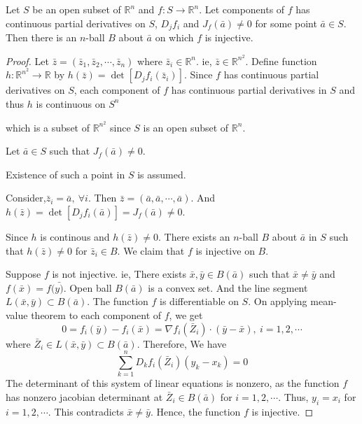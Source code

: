 \begin{theorem}
Let $S$ be an open subset of $\mathbb{R}^n$ and $f : S \to \mathbb{R}^n$.
Let components of $f$ has continuous partial derivatives on $S$, $D_jf_i$ and $J_f(\bar{a}) \ne 0$ for some point $\bar{a} \in S$.
Then there is an $n$-ball $B$ about $\bar{a}$ on which $f$ is injective.
\end{theorem}
\begin{proof}
Let $\bar{z} = (\bar{z}_1,\bar{z}_2,\cdots,\bar{z}_n)$ where $\bar{z}_i \in \mathbb{R}^n$.
ie, $\bar{z} \in \mathbb{R}^{n^2}$.
Define function $h : \mathbb{R}^{n^2} \to \mathbb{R}$ by $h(\bar{z}) = \det{[D_jf_i(\bar{z}_i)]}$.
Since $f$ has continuous partial derivatives on $S$, each component of $f$ has continuous partial derivatives in $S$ and thus $h$ is continuous on $S^n$ \begin{commentary} which is a subset of $\mathbb{R}^{n^2}$ since $S$ is an open subset of $\mathbb{R}^n$.
\end{commentary}

Let $\bar{a} \in S$ such that $J_f(\bar{a}) \ne 0$.
\begin{commentary}
Existence of such a point in $S$ is assumed.
\end{commentary}
Consider,$\bar{z}_i = \bar{a},\ \forall i$.
Then $\bar{z} = (\bar{a},\bar{a},\cdots,\bar{a})$.
And $h(\bar{z}) = \det{[D_jf_i(\bar{a})]} = J_f(\bar{a}) \ne 0$.

Since $h$ is continous and $h(\bar{z}) \ne 0$.
There exists an $n$-ball $B$ about $\bar{a}$ in $S$ such that $h(\bar{z}) \ne 0$ for $\bar{z}_i \in B$.
We claim that $f$ is injective on $B$.

Suppose $f$ is not injective.
ie, There exists $\bar{x},\bar{y} \in B(\bar{a})$ such that $\bar{x} \ne \bar{y}$ and $f(\bar{x}) = f(\bar{y)}$.
Open ball $B(\bar{a})$ is a convex set.
And the line segment $L(\bar{x},\bar{y}) \subset B(\bar{a})$.
The function $f$ is differentiable on $S$.
On applying mean-value theorem to each component of $f$, we get
$$0 = f_i(\bar{y})-f_i(\bar{x}) = \nabla f_i(\bar{Z}_i)\cdot(\bar{y}-\bar{x}),\ i=1,2,\cdots$$
where $\bar{Z}_i \in L(\bar{x},\bar{y}) \subset B(\bar{a})$.
Therefore, We have
$$ \sum_{k=1}^n D_kf_i(\bar{Z}_i)(y_k-x_k) = 0$$
The determinant of this system of linear equations is nonzero, as the function $f$ has nonzero jacobian determinant at $\bar{Z}_i \in B(\bar{a})$ for $i = 1,2,\cdots$.
Thus, $y_i = x_i$ for $i = 1,2,\cdots$. This contradicts $\bar{x} \ne \bar{y}$.
Hence, the function $f$ is injective.
\end{proof}

